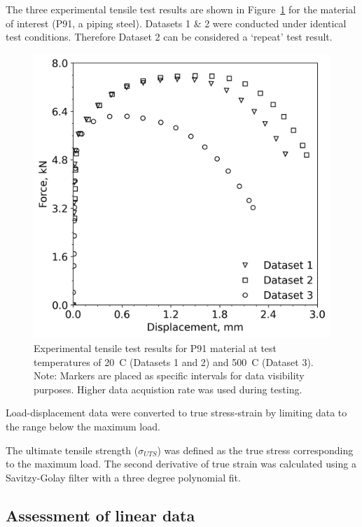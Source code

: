 \documentclass[preprint, review, 12pt]{elsarticle}
\begin{document}
{	The three experimental tensile test results are shown in Figure~\ref{fig:exp_test_results} for the material of interest (P91, a piping steel).
	Datasets 1 \& 2 were conducted under identical test conditions.
	Therefore Dataset 2 can be considered a `repeat' test result.
	\begin{figure}[!htbp]
		\centering
		\includegraphics[width=\linewidth, height=0.4\textheight, keepaspectratio]{EXPERIMENTAL_RESULTS}
		\caption{Experimental tensile test results for P91 material at test temperatures of 20~\degree C (Datasets 1 and 2) and 500~\degree C (Dataset 3). Note: Markers are placed as specific intervals for data visibility purposes. Higher data acquistion rate was used during testing.}
		\label{fig:exp_test_results}
	\end{figure}
	Load-displacement data were converted to true stress-strain by limiting data to the range below the maximum load.

	The ultimate tensile strength ($\sigma_{UTS}$) was defined as the true stress corresponding to the maximum load.
	The second derivative of true strain was calculated using a Savitzy-Golay filter with a three degree polynomial fit.

	\subsection{Assessment of linear data}
	\label{h:linear_region}

}
\end{document}
